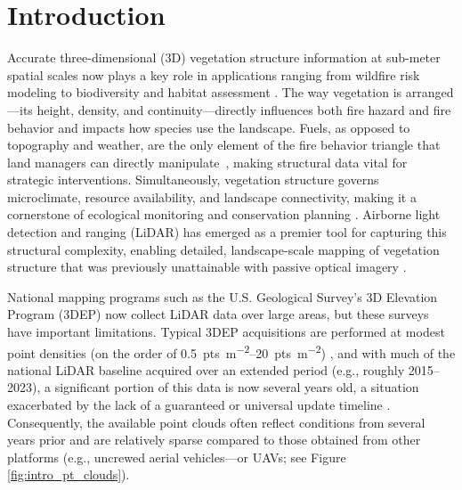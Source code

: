 \documentclass[remotesensing,article,accept,pdftex,moreauthors]{Definitions/mdpi}
\renewcommand{\hl}[1]{#1}
\begin{document}



\section{Introduction}

\hl{Accurate} %
 three-dimensional (3D) vegetation structure information at sub-meter spatial scales now plays a key role in applications ranging from wildfire risk modeling \cite{martin-ducup_unlocking_2025} to biodiversity and habitat assessment \cite{Merrick2013Into3D,moudry2023vegetation}. The way vegetation is arranged—its height, density, and continuity—directly influences both fire hazard and fire behavior and impacts how species use the landscape. Fuels, as opposed to topography and weather, are the only element of the fire behavior triangle that land managers can directly \mbox{manipulate \cite{agee_influence_1996}}, making structural data vital for strategic interventions. Simultaneously, vegetation structure governs microclimate, resource availability, and landscape connectivity, making it a cornerstone of ecological monitoring and conservation planning \cite{guo2018integrating, mahata2023microclimate,ustin2021current}. Airborne light detection and ranging (LiDAR) has emerged as a premier tool for capturing this structural complexity, enabling detailed, landscape-scale mapping of vegetation structure that was previously unattainable with passive optical imagery \cite{Merrick2013Into3D, belov2019capabilities, guo2020lidar}.

National mapping programs such as the U.S. Geological Survey's 3D Elevation Program (3DEP) now collect LiDAR data over large areas, but these surveys have important limitations. Typical 3DEP acquisitions are performed at modest point densities (on the order of \qtyrange{0.5}{20}{pts\per\square\meter}) \cite{wu2016evaluating}, and with much of the national LiDAR baseline acquired over an extended period (e.g., roughly 2015--2023), a significant portion of this data is now several years old, a situation exacerbated by the lack of a guaranteed or universal update timeline \cite{usgs_what_2019}. Consequently, the available point clouds often reflect conditions from several years prior and are relatively sparse compared to those obtained from other platforms (e.g., uncrewed aerial vehicles---or UAVs; see Figure \ref{fig:intro_pt_clouds}).
\end{document}
